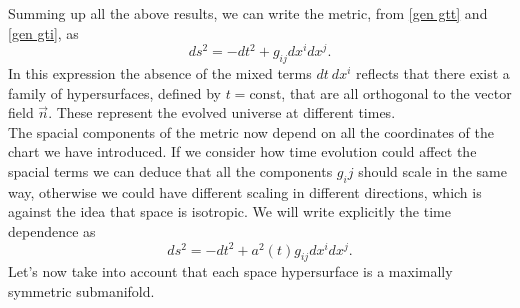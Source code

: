 Summing up all the above results, we can write the metric, from \eqref{gen gtt} and \eqref{gen gti}, as
\begin{equation*}
    ds^2=-dt^2+g_{ij}dx^i dx^j.
\end{equation*}
In this expression the absence of the mixed terms $dt\ dx^i$ reflects that there exist a family of hypersurfaces, defined by $t=$const, that are all orthogonal to the vector field $\vec n$. These represent the evolved universe at different times.\\
The spacial components of the metric now depend on all the coordinates of the chart we have introduced. If we consider how time evolution could affect the spacial terms we can deduce that all the components $g_ij$ should scale in the same way, otherwise we could have different scaling in different directions, which is against the idea that space is isotropic. We will write explicitly the time dependence as
\begin{equation*}
    ds^2=-dt^2+a^2(t)g_{ij}dx^i dx^j.
\end{equation*} 
Let's now take into account that each space hypersurface is a maximally symmetric submanifold.